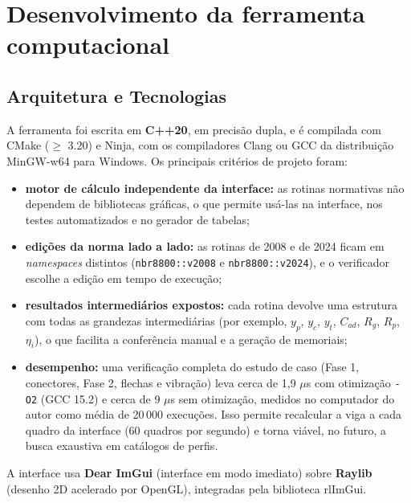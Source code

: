 \chapter{Desenvolvimento da ferramenta computacional}\label{cap:3}

\section{Arquitetura e Tecnologias}\label{sec:3.1}
A ferramenta foi escrita em \textbf{C++20}, em precisão dupla, e é compilada com CMake (\ensuremath{\ge} 3.20) e Ninja, com os compiladores Clang ou GCC da distribuição MinGW-w64 para Windows. Os principais critérios de projeto foram:
\begin{itemize}
\item \textbf{motor de cálculo independente da interface:} as rotinas normativas não dependem de bibliotecas gráficas, o que permite usá-las na interface, nos testes automatizados e no gerador de tabelas;
\item \textbf{edições da norma lado a lado:} as rotinas de 2008 e de 2024 ficam em \emph{namespaces} distintos (\texttt{nbr8800::v2008} e \texttt{nbr8800::v2024}), e o verificador escolhe a edição em tempo de execução;
\item \textbf{resultados intermediários expostos:} cada rotina devolve uma estrutura com todas as grandezas intermediárias (por exemplo, $y_p$, $y_c$, $y_t$, $C_{ad}$, $R_g$, $R_p$, $\eta_i$), o que facilita a conferência manual e a geração de memoriais;
\item \textbf{desempenho:} uma verificação completa do estudo de caso (Fase 1, conectores, Fase 2, flechas e vibração) leva cerca de 1,9 \ensuremath{\mu}s com otimização \texttt{-O2} (GCC 15.2) e cerca de 9 \ensuremath{\mu}s sem otimização, medidos no computador do autor como média de 20\,000 execuções. Isso permite recalcular a viga a cada quadro da interface (60 quadros por segundo) e torna viável, no futuro, a busca exaustiva em catálogos de perfis.
\end{itemize}

A interface usa \textbf{Dear ImGui} (interface em modo imediato) sobre \textbf{Raylib} (desenho 2D acelerado por OpenGL), integradas pela biblioteca rlImGui.


